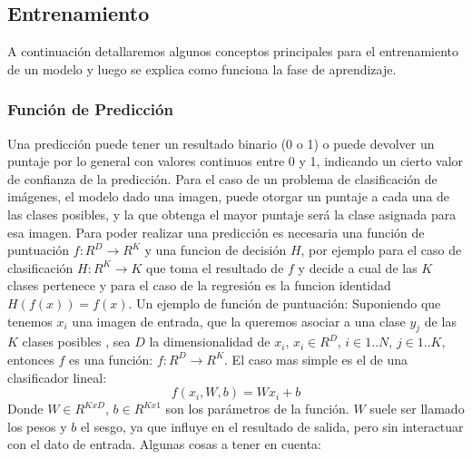 \documentclass[a4paper,11pt,spanish]{book}
\begin{document}
      \subsection{Entrenamiento}
	A continuación detallaremos algunos conceptos principales para el entrenamiento de un modelo y luego se explica como funciona la fase de aprendizaje.
	\subsubsection{Función de Predicción}
	  Una predicción puede tener un resultado binario (0 o 1) o puede devolver un puntaje por lo general con valores continuos entre 0 y 1, indicando un cierto valor de confianza
	  de la predicción. Para el caso de un problema de clasificación de imágenes, el modelo dado una imagen, puede otorgar un puntaje a cada una de las clases posibles,
	  y la que obtenga el mayor puntaje será la clase asignada para esa imagen. Para poder realizar una predicción es necesaria una función de puntuación $f:R^D {\rightarrow} R^K$
	  y una funcion de decisión $H$, por ejemplo para el caso de clasificación $H:R^K{\rightarrow}K$ que toma el resultado de $f$ y decide a cual de las $K$ clases pertenece y para
	  el caso de la regresión es la funcion identidad $H(f(x))=f(x)$.
	  Un ejemplo de función de puntuación:
	  Suponiendo que tenemos $x_{i}$  una imagen de entrada, que la queremos asociar a una clase $y_{j}$ de las $K$ clases posibles , sea $D$ la dimensionalidad de $x_{i}$, $x_{i} \in R^D$,
	  $i \in 1..N$, $j \in 1..K$, entonces $f$ es una función: $f:R^D {\rightarrow} R^K$. El caso mas simple es el de una clasificador lineal:\\
	  \begin{equation}
	    f(x_{i}, W, b) = W x_{i} + b
	  \end{equation}
	  Donde $W \in R^{KxD}$, $b \in R^{Kx1}$ son los parámetros de la función. $W$ suele ser llamado los pesos y $b$ el sesgo, ya que influye en el resultado de salida, pero sin
	  interactuar con el dato de entrada.
	  Algunas cosas a tener en cuenta:
\end{document}
